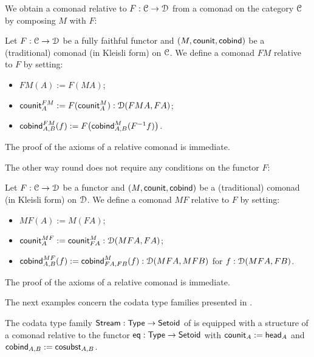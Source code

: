 \documentclass[a4paper,USenglish]{lipics}
\newcommand{\itemizedist}{.5em}
\begin{document}
\begin{Long}
We obtain a comonad relative to $F:{\mathcal{C}}\to\mathcal{D}$ from a comonad on the category ${\mathcal{C}}$ by composing $M$ with $F$:
\begin{ex}\label{ex_relcom_from_com}
  Let $F : {\mathcal{C}} \to \mathcal{D}$ be a fully faithful functor and $(M,\mathsf{counit},\mathsf{cobind})$ be a (traditional) comonad (in Kleisli form) on ${\mathcal{C}}$.
  We define a comonad $FM$ relative to $F$ by setting:
  \begin{itemize}\setlength{\itemsep}{\itemizedist}
   \item $FM(A) := F(MA)$;
   \item $\mathsf{counit}^{FM}_A := F(\mathsf{counit}^M_A) : \mathcal{D}(FMA,FA)$;
   \item $\mathsf{cobind}^{FM}_{A,B} (f) := F\bigl(\mathsf{cobind}^M_{A,B}(F^{-1}f)\bigr)$.
  \end{itemize}
  The proof of the axioms of a relative comonad is immediate.
\end{ex}

The other way round does not require any conditions on the functor $F$:
\begin{ex}\label{ex_relcom_from_com_on_target}
    Let $F : {\mathcal{C}} \to \mathcal{D}$ be a functor and $(M,\mathsf{counit},\mathsf{cobind})$ be a (traditional) comonad (in Kleisli form) on $\mathcal{D}$.
  We define a comonad $MF$ relative to $F$ by setting:
  \begin{itemize}\setlength{\itemsep}{\itemizedist}
   \item $MF(A) := M(FA)$;
   \item $\mathsf{counit}^{MF}_A := \mathsf{counit}^M_{FA} : \mathcal{D}(MFA,FA)$;
   \item $\mathsf{cobind}^{MF}_{A,B} (f) := \mathsf{cobind}^M_{FA,FB}(f) : \mathcal{D}(MFA,MFB)$ for $f : \mathcal{D}(MFA,FB)$.
  \end{itemize}
  The proof of the axioms of a relative comonad is immediate.
\end{ex}


\end{Long}

The next examples concern the codata type families presented in .

\begin{ex}[Streams]\label{ex_stream_comonad}
  The codata type family $\mathsf{Stream} : \mathsf{Type} \to \mathsf{Setoid}$ of  is equipped with a structure of a comonad relative to the functor 
  $\mathsf{eq} : \mathsf{Type} \to \mathsf{Setoid}$ with
   $\mathsf{counit}_A := \mathsf{head}_A$ and
   $\mathsf{cobind}_{A,B} := \mathsf{cosubst}_{A,B}$.
\end{ex}
\end{document}
